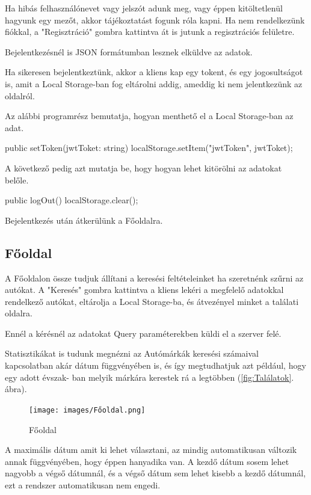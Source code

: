 Ha hibás felhasználónevet vagy jelszót adunk meg, vagy éppen kitöltetlenül hagyunk egy mezőt, akkor tájékoztatást fogunk róla kapni.
Ha nem rendelkezünk fiókkal, a "Regisztráció" gombra kattintva át is jutunk a regisztrációs felületre.

Bejelentkezésnél is JSON formátumban lesznek elküldve az adatok.

Ha sikeresen bejelentkeztünk, akkor a kliens kap egy tokent, és egy jogosultságot is, amit a Local Storage-ban fog eltárolni addig, ameddig ki nem jelentkezünk az oldalról.

Az alábbi programrész bemutatja, hogyan menthető el a Local Storage-ban az adat.

\begin{java}
public setToken(jwtToket: string) {
    localStorage.setItem("jwtToken", jwtToket);
}
\end{java}
A következő pedig azt mutatja be, hogy hogyan lehet kitörölni az adatokat belőle.

\begin{java}
public logOut() {
    localStorage.clear();
}
\end{java}

Bejelentkezés után átkerülünk a Főoldalra.

\subsection{Főoldal}

A Főoldalon össze tudjuk állítani a keresési feltételeinket ha szeretnénk szűrni az autókat.
A "Keresés" gombra kattintva a kliens lekéri a megfelelő adatokkal rendelkező autókat, eltárolja a Local Storage-ba, és átvezényel minket a találati oldalra.

Ennél a kérésnél az adatokat Query paraméterekben küldi el a szerver felé.

Statisztikákat is tudunk megnézni az Autómárkák keresési számaival kapcsolatban akár dátum függvényében is, és így megtudhatjuk azt például, hogy egy adott évszak-
ban melyik márkára kerestek rá a legtöbben (\ref{fig:Találatok}. ábra).

\begin{figure}[h]
\centering
\texttt{[image: images/Főoldal.png]}
\caption{Főoldal}
\label{fig:Főoldal}
\end{figure}

A maximális dátum amit ki lehet választani, az mindig automatikusan változik annak függvényében, hogy éppen hanyadika van.
A kezdő dátum sosem lehet nagyobb a végső dátumnál, és a végső dátum sem lehet kisebb a kezdő dátumnál, ezt a rendszer automatikusan nem engedi.


